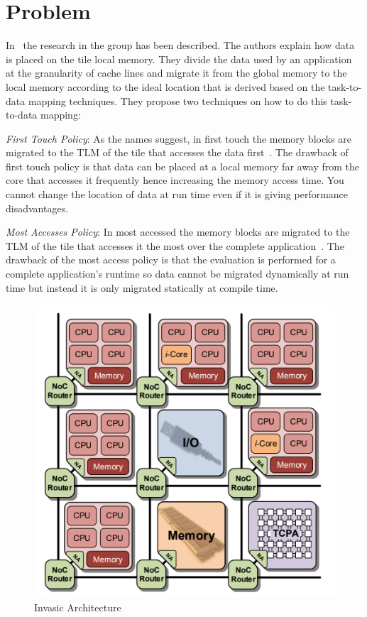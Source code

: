 \documentclass{listhesis}
\begin{document}
\section{Problem}
In~\cite{lispaper} the research in the group has been described. The authors explain how data is placed on the tile local memory. They divide the data used by an application at the granularity of cache lines and migrate it from the global memory to the local memory according to the ideal location that is derived based on the task-to-data mapping techniques. They propose two techniques on how to do this task-to-data mapping:\\
\par
\textit{First Touch Policy}: As the names suggest, in first touch the memory blocks are migrated to the TLM of the tile that accesses the data first~\cite{lispaper}. The drawback of first touch policy is that data can be placed at a local memory far away from the core that accesses it frequently hence increasing the memory access time. You cannot change the location of data at run time even if it is giving performance disadvantages.\\ 
\par
\textit{Most Accesses Policy}: In most accessed the memory blocks are migrated to the TLM of the tile that accesses it the most over the complete application~\cite{lispaper}. The drawback of the most access policy is that the evaluation is performed for a complete application's runtime so data cannot be migrated dynamically at run time but instead it is only migrated statically at compile time.
\begin{figure}[h!]
  \includegraphics[width=0.7\linewidth]{multi-core,tile.png}
  \centering
  \caption{Invasic Architecture~\cite{iNetworkAdapter}}
  \label{fig:multi-core,tile}
\end{figure}
\end{document}
